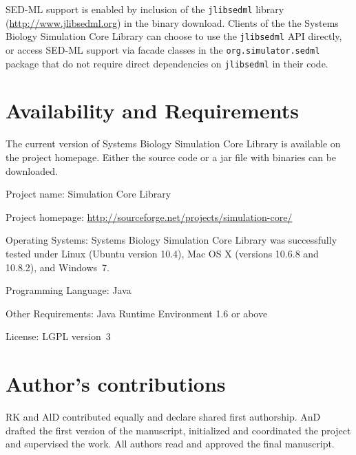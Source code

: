 \documentclass[10pt]{bmc_article}
\newenvironment{bmcformat}{\baselineskip20pt\sloppy\setboolean{publ}{false}}{\baselineskip20pt\sloppy}
\newcommand{\jlibsedml}{\texttt{jlibsedml}}
\begin{document}
\begin{bmcformat}
%
SED-ML support is enabled by inclusion of the \jlibsedml{} library
(\href{http://www.jlibsedml.org}{http://www.jlibsedml.org}) in the binary
download. Clients of the the Systems Biology Simulation Core Library can choose to use the
\jlibsedml{} API directly, or access SED-ML support via  facade classes
in the \texttt{org.simulator.sedml} package that do not require direct
dependencies on \jlibsedml{} in their code.


\section*{Availability and Requirements}
The current version of Systems Biology Simulation Core Library is available on the project homepage. Either the source code or a jar file with binaries can be downloaded.

Project name: Simulation Core Library

Project homepage: \url{http://sourceforge.net/projects/simulation-core/}

Operating Systems: Systems Biology Simulation Core Library was successfully tested under Linux (Ubuntu version 10.4), Mac OS X (versions 10.6.8 and 10.8.2), and Windows~7.

Programming Language: Java\texttrademark{}

Other Requirements: Java Runtime Environment 1.6 or above

License: LGPL version~3

\bigskip

\section*{Author's contributions}
RK and AlD contributed equally and declare shared first authorship.
AnD drafted the first version of the manuscript, initialized and coordinated the project and supervised the work.
All authors read and approved the final manuscript.
    


\end{bmcformat}
\end{document}
